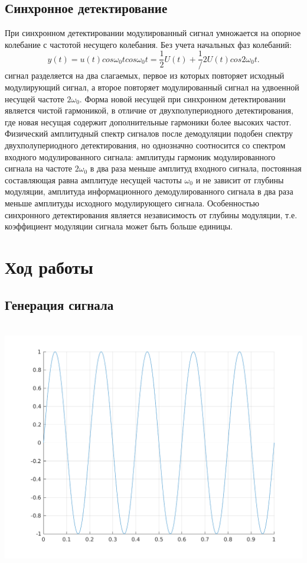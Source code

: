 \documentclass[a4paper]{article}
\begin{document}
\subsection{Синхронное детектирование}
При синхронном детектировании модулированный сигнал умножается на опорное колебание с частотой несущего колебания. Без учета начальных фаз колебаний: $$y(t)=u(t)cos \omega_0 t cos \omega_0 t = \frac{1}{2}U(t)+\frac{1}/{2} U(t) cos 2 \omega_0 t.$$
сигнал разделяется на два слагаемых, первое из которых повторяет исходный модулирующий сигнал, а второе повторяет модулированный сигнал на удвоенной несущей частоте $2 \omega_0$. Форма новой несущей при синхронном детектировании является чистой гармоникой, в отличие от двухполупериодного детектирования, где новая несущая содержит дополнительные гармоники более высоких частот. Физический амплитудный спектр сигналов после демодуляции подобен спектру двухполупериодного детектирования, но однозначно соотносится со спектром входного модулированного сигнала: амплитуды гармоник модулированного сигнала на частоте $2 \omega_0$ в два раза меньше амплитуд входного сигнала, постоянная составляющая равна амплитуде несущей частоты $\omega_0$ и не зависит от глубины модуляции, амплитуда информационного демодулированного сигнала в два раза меньше амплитуды исходного модулирующего сигнала. Особенностью синхронного детектирования является независимость от глубины модуляции, т.е. коэффициент модуляции сигнала может быть больше единицы.
\section{Ход работы}
\subsection{Генерация сигнала}
\\
\includegraphics[scale=0.7]{lab4/figures/figure_0.png}\\
\end{document}
